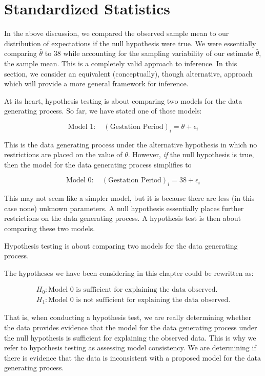 \documentclass[
]{book}
\theoremstyle{plain}
\theoremstyle{mydefn}
\theoremstyle{myexmpl}
\theoremstyle{remark}
\begin{document}
\hypertarget{standardized-statistics}{%
\section{Standardized Statistics}\label{standardized-statistics}}

In the above discussion, we compared the observed sample mean to our distribution of expectations if the null hypothesis were true. We were essentially comparing \(\widehat{\theta}\) to 38 while accounting for the sampling variability of our estimate \(\widehat{\theta}\), the sample mean. This is a completely valid approach to inference. In this section, we consider an equivalent (conceptually), though alternative, approach which will provide a more general framework for inference.

At its heart, hypothesis testing is about comparing two models for the data generating process. So far, we have stated one of those models:

\[\text{Model 1}: \quad (\text{Gestation Period})_i = \theta + \epsilon_i\]

This is the data generating process under the alternative hypothesis in which no restrictions are placed on the value of \(\theta\). However, \emph{if} the null hypothesis is true, then the model for the data generating process simplifies to

\[\text{Model 0}: \quad (\text{Gestation Period})_i = 38 + \epsilon_i\]

This may not seem like a simpler model, but it is because there are less (in this case none) unknown parameters. A null hypothesis essentially places further restrictions on the data generating process. A hypothesis test is then about comparing these two models.

\begin{rmdkeyidea}
Hypothesis testing is about comparing two models for the data generating process.
\end{rmdkeyidea}

The hypotheses we have been considering in this chapter could be rewritten as:

\[
\begin{aligned}
  H_0: \text{Model 0 is sufficient for explaining the data observed.} \\
  H_1: \text{Model 0 is not sufficient for explaining the data observed.}
\end{aligned}
\]

That is, when conducting a hypothesis test, we are really determining whether the data provides evidence that the model for the data generating process under the null hypothesis is sufficient for explaining the observed data. This is why we refer to hypothesis testing as assessing model consistency. We are determining if there is evidence that the data is inconsistent with a proposed model for the data generating process.
\end{document}
